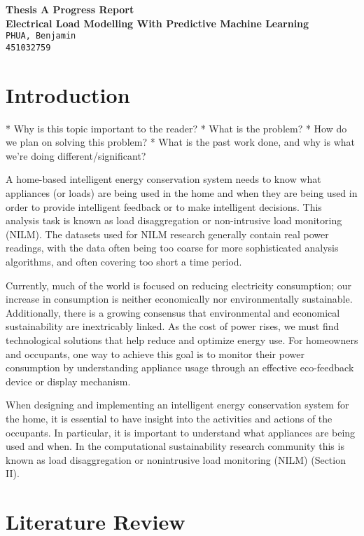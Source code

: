 \documentclass[12pt,twocolumn]{article}
\begin{document}
	\begin{center}
		\textbf{\Large Thesis A Progress Report} \\\vspace{4mm}
		\textbf{\Large Electrical Load Modelling With Predictive Machine Learning} \\\vspace{4mm}
		\texttt{PHUA, Benjamin\\451032759}
	\end{center}

	\section{Introduction}
		* Why is this topic important to the reader?
		* What is the problem?
		* How do we plan on solving this problem?
		* What is the past work done, and why is what we're doing different/significant?


		A home-based intelligent energy conservation system needs to know what appliances (or loads) are being used in the home and when they are being used in order to provide intelligent feedback or to make intelligent decisions. This analysis task is known as load disaggregation or non-intrusive load monitoring (NILM). The datasets used for NILM research generally contain real power readings, with the data often being too coarse for more sophisticated analysis algorithms, and often covering too short a time period.

		Currently, much of the world is focused on reducing electricity consumption; our increase in consumption is neither economically nor environmentally sustainable. Additionally, there is a growing consensus that environmental and economical sustainability are inextricably linked. As the cost of power rises, we must find technological solutions that help reduce and optimize energy use. For homeowners and occupants, one way to achieve this goal is to monitor their power consumption by understanding appliance usage through an effective eco-feedback device or display mechanism.

		When designing and implementing an intelligent energy conservation system for the home, it is essential to have insight into the activities and actions of the occupants. In particular, it is important to understand what appliances are being used and when. In the computational sustainability research community this is known as load disaggregation or nonintrusive load monitoring (NILM) (Section II). 


	\section{Literature Review}
\end{document}
